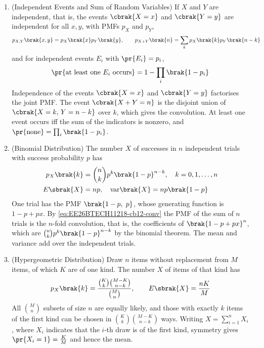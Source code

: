 \begin{enumerate}[label=\thesubsection.\arabic*, ref=\thesubsection.\theenumi,itemsep=1.5em]

\item (Independent Events and Sum of Random Variables) If $X$ and $Y$ are independent, that is, the events $\cbrak{X=x}$ and $\cbrak{Y=y}$ are independent for all $x,y$, with PMFs $p_X$ and $p_Y$,
\begin{align}
p_{X,Y}\brak{x,y} = p_X\brak{x}p_Y\brak{y}, \qquad p_{X+Y}\brak{n} = \sum_{k}p_X\brak{k}p_Y\brak{n-k}
\label{eq:EE26BTECH11218-cb12-conv}
\end{align}
and for independent events $E_i$ with $\pr{E_i}=p_i$,
\begin{align}
\pr{\text{at least one } E_i \text{ occurs}} = 1-\prod_i\brak{1-p_i}
\label{eq:EE26BTECH11218-cb12-atleast}
\end{align}
\solution Independence of the events $\cbrak{X=x}$ and $\cbrak{Y=y}$ factorises the joint PMF. The event $\cbrak{X+Y=n}$ is the disjoint union of $\cbrak{X=k,\,Y=n-k}$ over $k$, which gives the convolution. At least one event occurs iff the sum of the indicators is nonzero, and $\pr{\text{none}}=\prod_i\brak{1-p_i}$.

\item (Binomial Distribution) The number $X$ of successes in $n$ independent trials with success probability $p$ has
\begin{align}
p_X\brak{k} &= \binom{n}{k}p^k\brak{1-p}^{n-k}, \quad k=0,1,\dots,n \nonumber \\
E\sbrak{X} &= np, \quad \mathrm{var}\brak{X}=np\brak{1-p}
\label{eq:EE26BTECH11218-cb12-binom}
\end{align}
\solution One trial has the PMF $\brak{1-p,\ p}$, whose generating function is $1-p+px$. By \eqref{eq:EE26BTECH11218-cb12-conv} the PMF of the sum of $n$ trials is the $n$-fold convolution, that is, the coefficients of $\brak{1-p+px}^n$, which are $\binom{n}{k}p^k\brak{1-p}^{n-k}$ by the binomial theorem. The mean and variance add over the independent trials.

\item (Hypergeometric Distribution) Draw $n$ items without replacement from $M$ items, of which $K$ are of one kind. The number $X$ of items of that kind has
\begin{align}
p_X\brak{k} = \frac{\binom{K}{k}\binom{M-K}{n-k}}{\binom{M}{n}}, \qquad E\sbrak{X} = \frac{nK}{M}
\label{eq:EE26BTECH11218-cb12-hyper}
\end{align}
\solution All $\binom{M}{n}$ subsets of size $n$ are equally likely, and those with exactly $k$ items of the first kind can be chosen in $\binom{K}{k}\binom{M-K}{n-k}$ ways. Writing $X=\sum_{i=1}^{n}X_i$, where $X_i$ indicates that the $i$-th draw is of the first kind, symmetry gives $\pr{X_i=1}=\frac{K}{M}$ and hence the mean.


\end{enumerate}
